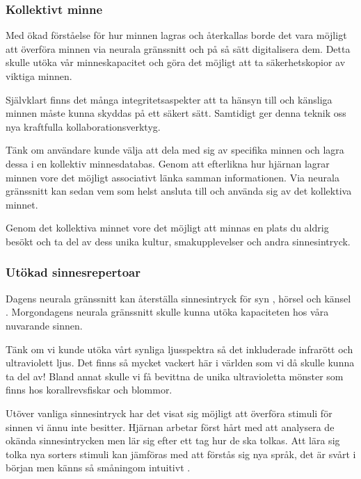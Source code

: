 \documentclass[12pt, a4paper]{article}
\begin{document}
%
%

\subsubsection{Kollektivt minne}

Med ökad förståelse för hur minnen lagras och återkallas borde det vara möjligt
att överföra minnen via neurala gränssnitt och på så sätt digitalisera dem.
Detta skulle utöka vår minneskapacitet och göra det möjligt att ta
säkerhetskopior av viktiga minnen.

Självklart finns det många integritetsaspekter att ta hänsyn till och känsliga
minnen måste kunna skyddas på ett säkert sätt. Samtidigt ger denna teknik oss
nya kraftfulla kollaborationsverktyg.

Tänk om användare kunde välja att dela med sig av specifika minnen och lagra
dessa i en kollektiv minnesdatabas. Genom att efterlikna hur hjärnan lagrar
minnen vore det möjligt associativt länka samman informationen. Via neurala
gränssnitt kan sedan vem som helst ansluta till och använda sig av det
kollektiva minnet.

Genom det kollektiva minnet vore det möjligt att minnas en plats du aldrig
besökt och ta del av dess unika kultur, smakupplevelser och andra sinnesintryck.


\subsubsection{Utökad sinnesrepertoar}

Dagens neurala gränssnitt kan återställa sinnesintryck för syn \cite{sight1},
hörsel \cite{sound} och känsel \cite{touch}. Morgondagens neurala gränssnitt
skulle kunna utöka kapaciteten hos våra nuvarande sinnen.

Tänk om vi kunde utöka vårt synliga ljusspektra så det inkluderade infrarött och
ultraviolett ljus. Det finns så mycket vackert här i världen som vi då skulle
kunna ta del av! Bland annat skulle vi få bevittna de unika ultravioletta
mönster som finns hos korallrevsfiskar \cite{uv_patterns} och blommor.

Utöver vanliga sinnesintryck har det visat sig möjligt att överföra stimuli för
sinnen vi ännu inte besitter. Hjärnan arbetar först hårt med att analysera de
okända sinnesintrycken men lär sig efter ett tag hur de ska tolkas. Att lära sig
tolka nya sorters stimuli kan jämföras med att förstås sig nya språk, det är
svårt i början men känns så småningom intuitivt \cite{learn_sense}.
\end{document}
